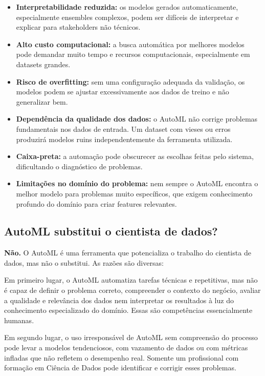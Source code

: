 \documentclass[11pt, a4paper, oneside]{article}
\begin{document}
\begin{itemize}[leftmargin=1.5cm, itemsep=4pt]
  \item \textbf{Interpretabilidade reduzida:} os modelos gerados automaticamente, especialmente ensembles complexos, podem ser difíceis de interpretar e explicar para stakeholders não técnicos.
  \item \textbf{Alto custo computacional:} a busca automática por melhores modelos pode demandar muito tempo e recursos computacionais, especialmente em datasets grandes.
  \item \textbf{Risco de overfitting:} sem uma configuração adequada da validação, os modelos podem se ajustar excessivamente aos dados de treino e não generalizar bem.
  \item \textbf{Dependência da qualidade dos dados:} o AutoML não corrige problemas fundamentais nos dados de entrada. Um dataset com vieses ou erros produzirá modelos ruins independentemente da ferramenta utilizada.
  \item \textbf{Caixa-preta:} a automação pode obscurecer as escolhas feitas pelo sistema, dificultando o diagnóstico de problemas.
  \item \textbf{Limitações no domínio do problema:} nem sempre o AutoML encontra o melhor modelo para problemas muito específicos, que exigem conhecimento profundo do domínio para criar features relevantes.
\end{itemize}

\subsection{AutoML substitui o cientista de dados?}
\label{sec:substitui}

\textbf{Não.} O AutoML é uma ferramenta que potencializa o trabalho do cientista de
dados, mas não o substitui. As razões são diversas:

Em primeiro lugar, o AutoML automatiza tarefas técnicas e repetitivas, mas não é
capaz de definir o problema correto, compreender o contexto do negócio, avaliar a
qualidade e relevância dos dados nem interpretar os resultados à luz do conhecimento
especializado do domínio. Essas são competências essencialmente humanas.

Em segundo lugar, o uso irresponsável de AutoML sem compreensão do processo pode
levar a modelos tendenciosos, com vazamento de dados ou com métricas infladas que
não refletem o desempenho real. Somente um profissional com formação em Ciência de
Dados pode identificar e corrigir esses problemas.
\end{document}
